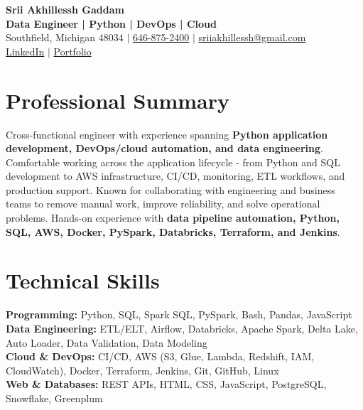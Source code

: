 \documentclass[letterpaper,10pt]{article}
\begin{document}
\fontsize{9.35pt}{10.45pt}\selectfont

\begin{center}
    {\LARGE \textbf{Srii Akhillessh Gaddam}} \\[-1pt]
    \textbf{Data Engineer | Python | DevOps | Cloud} \\[2pt]
    Southfield, Michigan 48034 $|$
    \href{tel:6468752400}{646-875-2400} $|$
    \href{mailto:sriiakhillessh@gmail.com}{sriiakhillessh@gmail.com} \\[1pt]
    \href{https://www.linkedin.com/in/srii-akhiilessh-gaddam-b48668191/}{LinkedIn} $|$
    \href{https://sriiakhillesshg.github.io/portfolio/}{Portfolio}
\end{center}
\vspace{-8pt}

\section{Professional Summary}
\small{Cross-functional engineer with experience spanning \textbf{Python application development, DevOps/cloud automation, and data engineering}. Comfortable working across the application lifecycle - from Python and SQL development to AWS infrastructure, CI/CD, monitoring, ETL workflows, and production support. Known for collaborating with engineering and business teams to remove manual work, improve reliability, and solve operational problems. Hands-on experience with \textbf{data pipeline automation, Python, SQL, AWS, Docker, PySpark, Databricks, Terraform, and Jenkins}.}

\section{Technical Skills}
\small{
\textbf{Programming:} Python, SQL, Spark SQL, PySpark, Bash, Pandas, JavaScript \\
\textbf{Data Engineering:} ETL/ELT, Airflow, Databricks, Apache Spark, Delta Lake, Auto Loader, Data Validation, Data Modeling \\
\textbf{Cloud \& DevOps:} CI/CD, AWS (S3, Glue, Lambda, Redshift, IAM, CloudWatch), Docker, Terraform, Jenkins, Git, GitHub, Linux \\
\textbf{Web \& Databases:} REST APIs, HTML, CSS, JavaScript, PostgreSQL, Snowflake, Greenplum
}

\end{document}
